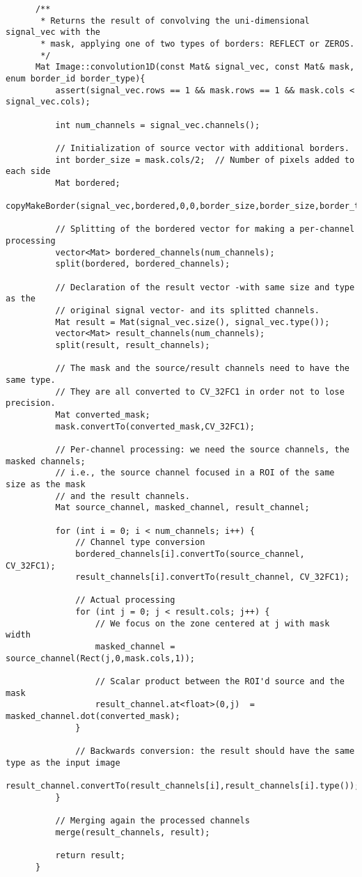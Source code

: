 \documentclass[a4paper, 11pt]{article}
\theoremstyle{definition}
\theoremstyle{theorem}
\begin{document}
  \begin{lstlisting}
      /**
       * Returns the result of convolving the uni-dimensional signal_vec with the
       * mask, applying one of two types of borders: REFLECT or ZEROS.
       */
      Mat Image::convolution1D(const Mat& signal_vec, const Mat& mask, enum border_id border_type){
          assert(signal_vec.rows == 1 && mask.rows == 1 && mask.cols < signal_vec.cols);

          int num_channels = signal_vec.channels();

          // Initialization of source vector with additional borders.
          int border_size = mask.cols/2;  // Number of pixels added to each side
          Mat bordered;
          copyMakeBorder(signal_vec,bordered,0,0,border_size,border_size,border_type,0.0);

          // Splitting of the bordered vector for making a per-channel processing
          vector<Mat> bordered_channels(num_channels);
          split(bordered, bordered_channels);

          // Declaration of the result vector -with same size and type as the
          // original signal vector- and its splitted channels.
          Mat result = Mat(signal_vec.size(), signal_vec.type());
          vector<Mat> result_channels(num_channels);
          split(result, result_channels);

          // The mask and the source/result channels need to have the same type.
          // They are all converted to CV_32FC1 in order not to lose precision.
          Mat converted_mask;
          mask.convertTo(converted_mask,CV_32FC1);

          // Per-channel processing: we need the source channels, the masked channels;
          // i.e., the source channel focused in a ROI of the same size as the mask
          // and the result channels.
          Mat source_channel, masked_channel, result_channel;

          for (int i = 0; i < num_channels; i++) {
              // Channel type conversion
              bordered_channels[i].convertTo(source_channel, CV_32FC1);
              result_channels[i].convertTo(result_channel, CV_32FC1);

              // Actual processing
              for (int j = 0; j < result.cols; j++) {
                  // We focus on the zone centered at j with mask width
                  masked_channel = source_channel(Rect(j,0,mask.cols,1));

                  // Scalar product between the ROI'd source and the mask
                  result_channel.at<float>(0,j)  = masked_channel.dot(converted_mask);
              }

              // Backwards conversion: the result should have the same type as the input image
              result_channel.convertTo(result_channels[i],result_channels[i].type());
          }

          // Merging again the processed channels
          merge(result_channels, result);

          return result;
      }
  \end{lstlisting}
\end{document}
